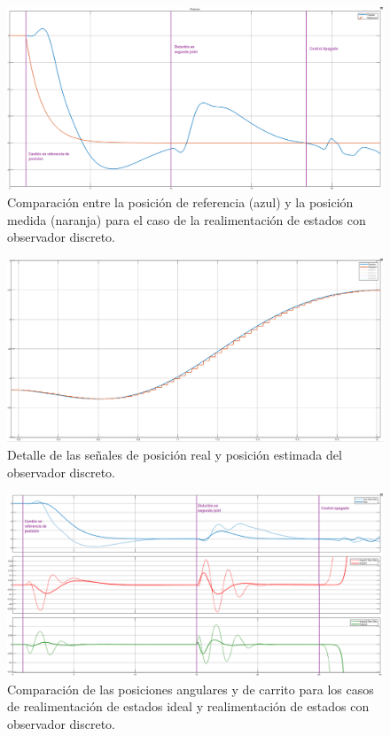 \begin{figure}[H]
	\centering
	\includegraphics[width=\linewidth]{../Analisis de Resultados/ImagenesAnalisis de Resultados/obsv_disc_posref.png}
	\caption{Comparación entre la posición de referencia (azul) y la posición medida (naranja) para el caso de la realimentación de estados con observador discreto.}	
	\label{fig:obsv_disc_posref}
\end{figure}

\begin{figure}[H]
	\centering
	\includegraphics[width=\linewidth]{../Analisis de Resultados/ImagenesAnalisis de Resultados/obsv_disc_posdisc.png}
	\caption{Detalle de las señales de posición real y posición estimada del observador discreto.}	
	\label{fig:obsv_disc_posdisc}
\end{figure}

\begin{figure}[H]
	\centering
	\includegraphics[width=\linewidth]{../Analisis de Resultados/ImagenesAnalisis de Resultados/disc_vs_ideal_vars.png}
	\caption{Comparación de las posiciones angulares y de carrito para los casos de realimentación de estados ideal y realimentación de estados con observador discreto.}	
	\label{fig:disc_vs_ideal_vars}
\end{figure}

